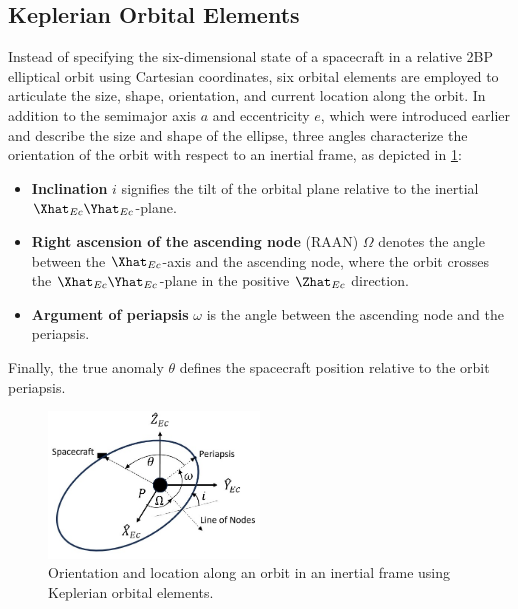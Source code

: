 \subsection{Keplerian Orbital Elements}
Instead of specifying the six-dimensional state of a spacecraft in a relative 2BP elliptical orbit
using Cartesian coordinates, six orbital elements are employed to articulate the size, shape,
orientation, and current location along the orbit. In addition to the semimajor axis $a$ and
eccentricity $e$, which were introduced earlier and describe the size and shape of the ellipse,
three angles characterize the orientation of the orbit with respect to an inertial frame, as
depicted in \cref{fig:orbitalElements}:
\begin{itemize}
    \item \textbf{Inclination} $i$ signifies the tilt of the orbital plane relative to the inertial
    $\Xhat_{Ec}\Yhat_{Ec}$-plane.
    \item \textbf{Right ascension of the ascending node} (RAAN) $\Omega$ denotes the angle between
    the $\Xhat_{Ec}$-axis and the ascending node, where the orbit crosses the
    $\Xhat_{Ec}\Yhat_{Ec}$-plane in the positive $\Zhat_{Ec}$ direction.
    \item \textbf{Argument of periapsis} $\omega$ is the angle between the ascending node and the
    periapsis.
\end{itemize}
Finally, the true anomaly $\theta$ defines the spacecraft position relative to the orbit periapsis.

\begin{figure}[ht]
    \centering
    \includegraphics[width=0.5\textwidth]{figures/OrbitalElements.jpg}
    \caption{Orientation and location along an orbit in an inertial frame using Keplerian orbital elements.}
    \label{fig:orbitalElements}
\end{figure}

